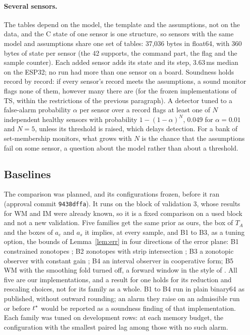 \paragraph{Several sensors.} The tables depend on the model, the template and the assumptions, not on the data, and
the C state of one sensor is one structure, so sensors with the same model and assumptions share one set of tables: 37,036 bytes in
float64, with 360 bytes of state per sensor (the 42 supports, the command part, the flag and the sample counter). Each
added sensor adds its state and its step, 3.63\,ms median on the ESP32; no run had more than one sensor on a board.
Soundness holds record by record: if every sensor's record meets the assumptions, a sound monitor flags none of them,
however many there are (for the frozen implementations of TS, within the restrictions of the previous paragraph). A
detector tuned to a false-alarm probability $\alpha$ per sensor over a record flags at least one of $N$ independent
healthy sensors with probability
$1-(1-\alpha)^N$, 0.049 for $\alpha = 0.01$ and $N = 5$, unless its threshold is raised, which delays detection. For a
bank of set-membership monitors, what grows with $N$ is the chance that the assumptions fail on some sensor, a question
about the model rather than about a threshold.

\subsection{Baselines}\label{sec:baselines}

The comparison was planned, and its configurations frozen, before it ran (approval commit \texttt{9438dffa}). It runs
on the block of validation 3, whose results for WM and IM were already known, so it is a fixed comparison on a used
block and not a new validation. Five families get the same prior as ours, the box of $T_A$ and the boxes of $a_c$ and
$a_s$ it implies, at every sample, and B1 to B3, as a tuning option, the bounds of Lemma~\ref{lem:err} in four
directions of the error plane: B1 constrained zonotopes \citep{scott2016}; B2 zonotopes with strip intersection
\citep{alamo2005}; B3 a zonotopic observer with constant gain \citep{combastel2015}; B4 an interval observer in
cooperative form; B5 WM with the smoothing fold turned off, a forward window in the style of \citet{kesavan2001}. All
five are our implementations, and a result for one holds for its reduction and rescaling choices, not for its family
as a whole. B1
to B4 run in plain binary64 as published, without outward rounding; an alarm they raise on an admissible run or
before $t^{\ast}$ would be reported as a soundness finding of that implementation. Each family was tuned on development
rows: at each memory budget, the configuration with the smallest paired lag among those with no such alarm.

